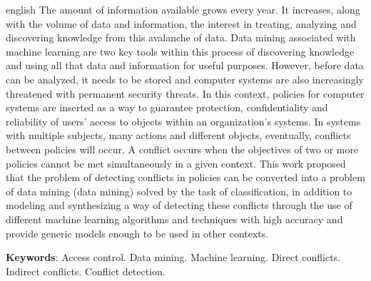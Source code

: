 \documentclass[
	12pt,				%
	openright,			%
	oneside,			%
	a4paper,			%
	english,			%
	french,				%
	spanish,			%
	brazil				%
	]{abntex2}
\renewcommand{\lstlistingname}{Código}
\renewcommand{\lstlistlistingname}{Lista de códigos}
\let\oldlstlistoflistings\lstlistoflistings
\renewcommand{\lstlistoflistings}{%
	\begingroup%
	\let\oldnumberline\numberline%
	\renewcommand{\numberline}{\lstlistingname\space\oldnumberline}%
	\oldlstlistoflistings%
	\endgroup}
\begin{document}
\begin{resumo}[Abstract]
 \begin{otherlanguage*}{english}
   The amount of information available grows every year. It increases, along with the volume of data and information, the interest in treating, analyzing and discovering knowledge from this avalanche of data. Data mining associated with machine learning are two key tools within this process of discovering knowledge and using all that data and information for useful purposes. However, before data can be analyzed, it needs to be stored and computer systems are also increasingly threatened with permanent security threats. In this context, policies for computer systems are inserted as a way to guarantee protection, confidentiality and reliability of users' access to objects within an organization's systems. In systems with multiple subjects, many actions and different objects, eventually, conflicts between policies will occur. A conflict occurs when the objectives of two or more policies cannot be met simultaneously in a given context. This work proposed that the problem of detecting conflicts in policies can be converted into a problem of data mining (data mining) solved by the task of classification, in addition to modeling and synthesizing a way of detecting these conflicts through the use of different machine learning algorithms and techniques with high accuracy and provide generic models enough to be used in other contexts.

   \vspace{\onelineskip}
 
   \noindent 
   \textbf{Keywords}: Access control. Data mining. Machine learning. Direct conflicts. Indirect conflicts. Conflict detection.
 \end{otherlanguage*}
\end{resumo}

\listoffigures*
\cleardoublepage


\pdfbookmark[0]{\lstlistlistingname}{lol}
\begin{KeepFromToc}
	\lstlistoflistings
\end{KeepFromToc}
\cleardoublepage
\end{document}
